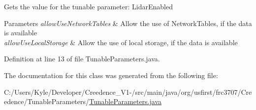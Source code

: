 Gets the value for the tunable parameter\+: Lidar\+Enabled


\begin{DoxyParams}{Parameters}
{\em allow\+Use\+Network\+Tables} & Allow the use of Network\+Tables, if the data is available \\
\hline
{\em allow\+Use\+Local\+Storage} & Allow the use of local storage, if the data is available \\
\hline
\end{DoxyParams}


Definition at line 13 of file Tunable\+Parameters.\+java.



The documentation for this class was generated from the following file\+:\begin{DoxyCompactItemize}
\item 
C\+:/\+Users/\+Kyle/\+Developer/\+Creedence\+\_\+\+V1-\//src/main/java/org/usfirst/frc3707/\+Creedence/\+Tunable\+Parameters/\mbox{\hyperlink{_tunable_parameters_8java}{Tunable\+Parameters.\+java}}\end{DoxyCompactItemize}
